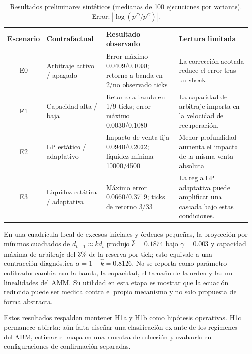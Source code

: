 \begin{table}[!ht]
\centering
\scriptsize
\caption{Resultados preliminares sintéticos (medianas de 100 ejecuciones por variante).
Error: $|\log(p^D/p^C)|$.}
\begin{tabularx}{\textwidth}{@{}c >{\raggedright\arraybackslash}p{2.7cm} >{\raggedright\arraybackslash}p{4.5cm} X@{}}
\toprule
\textbf{Escenario} & \textbf{Contrafactual} & \textbf{Resultado observado} &
\textbf{Lectura limitada} \\
\midrule
E0 & Arbitraje activo / apagado & Error máximo 0.0409/0.1000; retorno a banda en
  2/no observado ticks & La corrección acotada reduce el error tras un shock. \\
E1 & Capacidad alta / baja & Retorno a banda en 1/9 ticks; error máximo 0.0030/0.1080 &
  La capacidad de arbitraje importa en la velocidad de recuperación. \\
E2 & LP estático / adaptativo & Impacto de venta fija 0.0940/0.2032; liquidez mínima
  10000/4500 & Menor profundidad aumenta el impacto de la misma venta absoluta. \\
E3 & Liquidez estática / adaptativa & Máximo error 0.0660/0.3719; ticks de retorno 3/33 &
  La regla LP adaptativa puede amplificar una cascada bajo estas condiciones. \\
\bottomrule
\end{tabularx}
\end{table}

En una cuadrícula local de excesos iniciales y órdenes pequeñas, la proyección por
mínimos cuadrados de $d_{t+1}\approx k d_t$ produjo $\hat{k}=0.1874$ bajo
$\gamma=0.003$ y capacidad máxima de arbitraje del 3\% de la reserva por tick; esto
equivale a una contracción diagnóstica $\hat{\alpha}=1-\hat{k}=0.8126$. No se reporta
como parámetro calibrado: cambia con la banda, la capacidad, el tamaño de la orden y
las no linealidades del AMM. Su utilidad en esta etapa es mostrar que la ecuación
reducida puede ser medida contra el propio mecanismo y no solo propuesta de forma
abstracta.

Estos resultados respaldan mantener H1a y H1b como hipótesis operativas. H1c
permanece abierta: aún falta diseñar una clasificación ex ante de los regímenes del
ABM, estimar el mapa en una muestra de selección y evaluarlo en configuraciones de
confirmación separadas.

